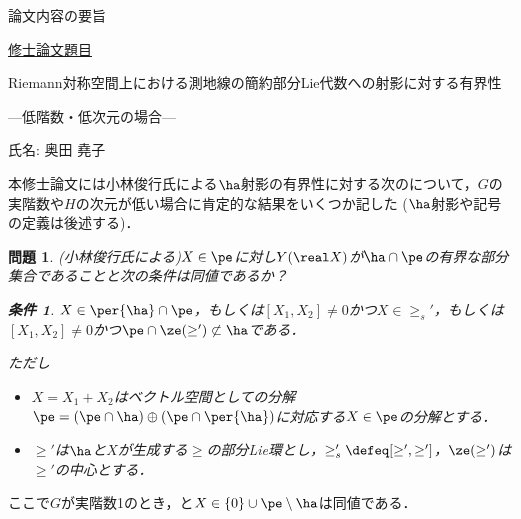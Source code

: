 \documentclass[12pt,dvipdfmx,uplatex]{jsarticle}
\newcounter{countabst}
\newtheorem{prob-a}[countabst]{問題}
\newtheorem{cond-a}[countabst]{条件}
\newcommand{\nsubset}{\not\subset}
\begin{document}
% 
\begin{center}
  論文内容の要旨
\end{center}

\noindent\underline{修士論文題目}
\vspace{-1em}
\begin{center}
  Riemann対称空間上における測地線の簡約部分Lie代数への射影に対する有界性

  ---低階数・低次元の場合---
\end{center}
\vspace{-0.5em}

\noindent 氏名: 奥田 堯子

\vspace{0.5em}

本修士論文には小林俊行氏による$\ha$射影の有界性に対する次のについて，$G$の実階数や$H$の次元が低い場合に肯定的な結果をいくつか記した ($\ha$射影や記号の定義は後述する)．

\begin{prob-a}(小林俊行氏による)\label{prob:1121}
  $X\in \pe$に対し$Y(\real X)$が$ \ha\cap \pe$の有界な部分集合であることと次の条件は同値であるか？
  \begin{cond-a}\label{cond:a}
    $X\in \per{\ha}\cap\pe $，もしくは$[X_1, X_2] \neq 0 $かつ$X\in \ge_{s}' $，もしくは$[X_1, X_2] \neq 0 $かつ$\pe\cap \ze(\ge') \nsubset \ha  $である．
  \end{cond-a}

  ただし
  \begin{itemize}
    \vspace{-1em}
  \item $X = X_1 + X_2 $はベクトル空間としての分解$\pe =(\pe\cap \ha)\oplus(\pe\cap\per{\ha}) $に対応する$X\in \pe$の分解とする．
  \item $\ge ' $は$\ha$と$X$が生成する$\ge$の部分Lie環とし，$\ge'_{s} \defeq [\ge',\ge'] $，$\ze(\ge') $は$\ge'$の中心とする．
  \end{itemize}
\end{prob-a}
\vspace{-0.5em}
ここで$G$が実階数1のとき，と$X\in \{0\}\cup\pe\setminus\ha $は同値である．
\end{document}
